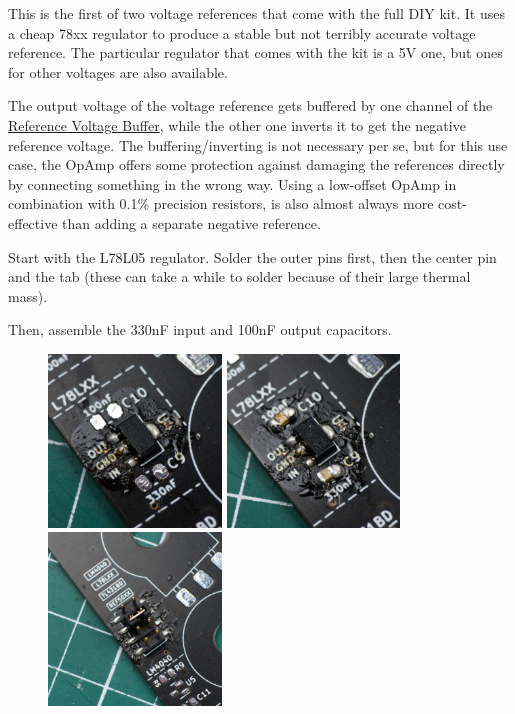 \documentclass[12pt, a4paper]{article}
\begin{document}
This is the first of two voltage references that come with the full DIY kit. It uses a cheap
78xx regulator to produce a stable but not terribly accurate voltage reference. The particular
regulator that comes with the kit is a 5V one, but ones for other voltages are also available.

The output voltage of the voltage reference gets buffered by one channel of the
\hyperref[sec:reference_voltage_buffer]{Reference Voltage Buffer}, while the other one inverts
it to get the negative reference voltage. The buffering/inverting is not necessary per se, but
for this use case, the OpAmp offers some protection against damaging the references directly
by connecting something in the wrong way. Using a low-offset OpAmp in combination with 0.1\%
precision resistors, is also almost always more cost-effective than adding a separate negative
reference.

Start with the L78L05 regulator. Solder the outer pins first, then the center pin and the tab
(these can take a while to solder because of their large thermal mass).

Then, assemble the 330nF input and 100nF output capacitors.

\begin{figure}[H]
    \centering
    \includegraphics[width=46mm]{images/section_1-5_regulator.jpg}
    \hspace{2mm}
    \includegraphics[width=46mm]{images/section_1-5_capacitors.jpg}
    \hspace{2mm}
    \includegraphics[width=46mm]{images/section_1-5_header.jpg}
\end{figure}
\end{document}
